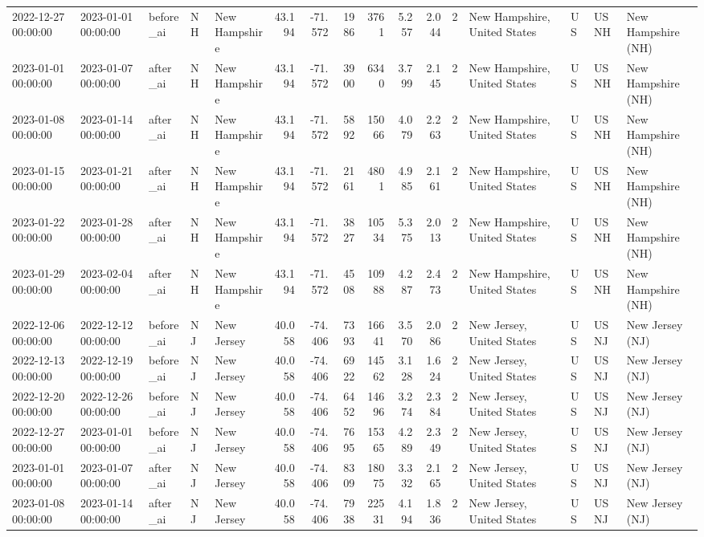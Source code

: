 \begin{tabular}{lllllrrrrrrlllll}
2022-12-27 00:00:00 & 2023-01-01 00:00:00 & before\_ai & NH & New Hampshire & 43.194 & -71.572 & 1986 & 3761 & 5.257 & 2.044 & 2 & New Hampshire, United States & US & USNH & New Hampshire (NH) \\
2023-01-01 00:00:00 & 2023-01-07 00:00:00 & after\_ai & NH & New Hampshire & 43.194 & -71.572 & 3900 & 6340 & 3.799 & 2.145 & 2 & New Hampshire, United States & US & USNH & New Hampshire (NH) \\
2023-01-08 00:00:00 & 2023-01-14 00:00:00 & after\_ai & NH & New Hampshire & 43.194 & -71.572 & 5892 & 15066 & 4.079 & 2.263 & 2 & New Hampshire, United States & US & USNH & New Hampshire (NH) \\
2023-01-15 00:00:00 & 2023-01-21 00:00:00 & after\_ai & NH & New Hampshire & 43.194 & -71.572 & 2161 & 4801 & 4.985 & 2.161 & 2 & New Hampshire, United States & US & USNH & New Hampshire (NH) \\
2023-01-22 00:00:00 & 2023-01-28 00:00:00 & after\_ai & NH & New Hampshire & 43.194 & -71.572 & 3827 & 10534 & 5.375 & 2.013 & 2 & New Hampshire, United States & US & USNH & New Hampshire (NH) \\
2023-01-29 00:00:00 & 2023-02-04 00:00:00 & after\_ai & NH & New Hampshire & 43.194 & -71.572 & 4508 & 10988 & 4.287 & 2.473 & 2 & New Hampshire, United States & US & USNH & New Hampshire (NH) \\
2022-12-06 00:00:00 & 2022-12-12 00:00:00 & before\_ai & NJ & New Jersey & 40.058 & -74.406 & 7393 & 16641 & 3.570 & 2.086 & 2 & New Jersey, United States & US & USNJ & New Jersey (NJ) \\
2022-12-13 00:00:00 & 2022-12-19 00:00:00 & before\_ai & NJ & New Jersey & 40.058 & -74.406 & 6922 & 14562 & 3.128 & 1.624 & 2 & New Jersey, United States & US & USNJ & New Jersey (NJ) \\
2022-12-20 00:00:00 & 2022-12-26 00:00:00 & before\_ai & NJ & New Jersey & 40.058 & -74.406 & 6452 & 14696 & 3.274 & 2.384 & 2 & New Jersey, United States & US & USNJ & New Jersey (NJ) \\
2022-12-27 00:00:00 & 2023-01-01 00:00:00 & before\_ai & NJ & New Jersey & 40.058 & -74.406 & 7695 & 15365 & 4.289 & 2.349 & 2 & New Jersey, United States & US & USNJ & New Jersey (NJ) \\
2023-01-01 00:00:00 & 2023-01-07 00:00:00 & after\_ai & NJ & New Jersey & 40.058 & -74.406 & 8309 & 18075 & 3.332 & 2.165 & 2 & New Jersey, United States & US & USNJ & New Jersey (NJ) \\
2023-01-08 00:00:00 & 2023-01-14 00:00:00 & after\_ai & NJ & New Jersey & 40.058 & -74.406 & 7938 & 22531 & 4.194 & 1.836 & 2 & New Jersey, United States & US & USNJ & New Jersey (NJ) \\

\end{tabular}
